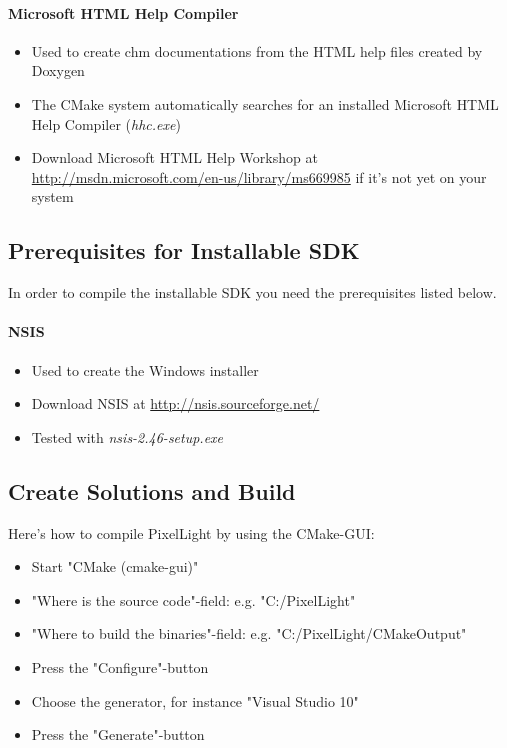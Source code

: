 \paragraph{Microsoft \ac{HTML} Help Compiler}
\begin{itemize}
\item{Used to create chm documentations from the \ac{HTML} help files created by Doxygen}
\item{The CMake system automatically searches for an installed Microsoft \ac{HTML} Help Compiler (\emph{hhc.exe})}
\item{Download Microsoft \ac{HTML} Help Workshop at \url{http://msdn.microsoft.com/en-us/library/ms669985} if it's not yet on your system}
\end{itemize}



\subsection{Prerequisites for Installable \ac{SDK}}
In order to compile the installable \ac{SDK} you need the prerequisites listed below.


\paragraph{\ac{NSIS}}
\begin{itemize}
\item{Used to create the Windows installer}
\item{Download \ac{NSIS} at \url{http://nsis.sourceforge.net/}}
\item{Tested with \emph{nsis-2.46-setup.exe}}
\end{itemize}




\subsection{Create Solutions and Build}
Here's how to compile PixelLight by using the CMake-\ac{GUI}:
\begin{itemize}
\item{Start "CMake (cmake-gui)"}
\item{"Where is the source code"-field: e.g. "C:/PixelLight"}
\item{"Where to build the binaries"-field: e.g. "C:/PixelLight/CMakeOutput"}
\item{Press the "Configure"-button}
\item{Choose the generator, for instance "Visual Studio 10"}
\item{Press the "Generate"-button}
\end{itemize}

